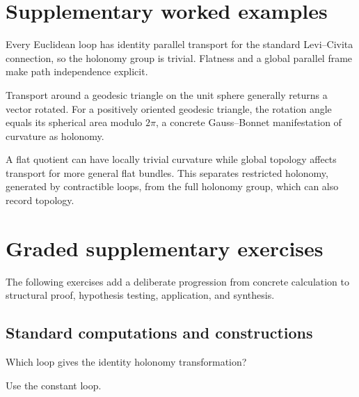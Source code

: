 \section{Supplementary worked examples}
\label{sec:vii25-pedagogy}

\begin{example}\label{ex:vii25-ped-01}
Every Euclidean loop has identity parallel transport for the standard Levi--Civita connection, so the holonomy group is trivial.  Flatness and a global parallel frame make path independence explicit.
\end{example}

\begin{example}\label{ex:vii25-ped-02}
Transport around a geodesic triangle on the unit sphere generally returns a vector rotated.  For a positively oriented geodesic triangle, the rotation angle equals its spherical area modulo \(2\pi\), a concrete Gauss--Bonnet manifestation of curvature as holonomy.
\end{example}

\begin{example}\label{ex:vii25-ped-03}
A flat quotient can have locally trivial curvature while global topology affects transport for more general flat bundles.  This separates restricted holonomy, generated by contractible loops, from the full holonomy group, which can also record topology.
\end{example}

\section{Graded supplementary exercises}
The following exercises add a deliberate progression from concrete calculation to structural proof, hypothesis testing, application, and synthesis.

\subsection*{Standard computations and constructions}

\begin{exercise}\label{exr:vii25-ped-01}
Which loop gives the identity holonomy transformation?
\end{exercise}

\begin{hint}
Use the constant loop.
\end{hint}

